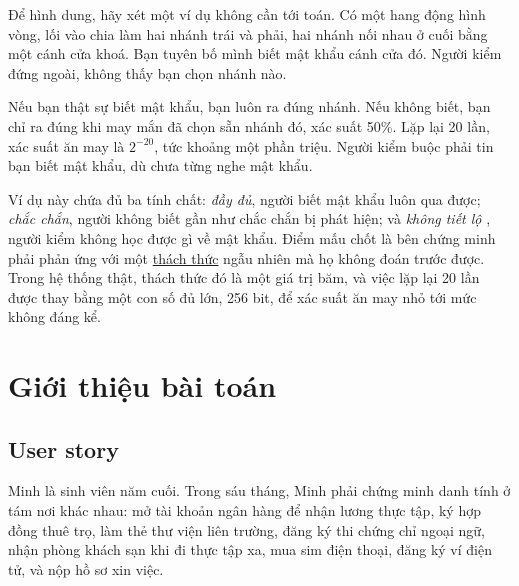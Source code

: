 \documentclass[a4paper,11pt,oneside]{report}
\theoremstyle{definition}
\theoremstyle{plain}
\newcommand{\g}[2]{\hyperref[term:#1]{#2}}
\begin{document}
Để hình dung, hãy xét một ví dụ không cần tới toán. Có một hang động hình vòng, lối vào chia làm
hai nhánh trái và phải, hai nhánh nối nhau ở cuối bằng một cánh cửa khoá. Bạn tuyên bố mình biết
mật khẩu cánh cửa đó. Người kiểm đứng ngoài, không thấy bạn chọn nhánh nào.

\begin{center}
\end{center}

Nếu bạn thật sự biết mật khẩu, bạn luôn ra đúng nhánh. Nếu không biết, bạn chỉ ra đúng khi may
mắn đã chọn sẵn nhánh đó, xác suất 50\%. Lặp lại 20 lần, xác suất ăn may là $2^{-20}$, tức khoảng
một phần triệu. Người kiểm buộc phải tin bạn biết mật khẩu, dù chưa từng nghe mật khẩu.

Ví dụ này chứa đủ ba tính chất: \emph{đầy đủ}, người biết mật khẩu luôn qua được;
\emph{chắc chắn}, người không biết gần như chắc chắn bị phát hiện; và \emph{không tiết lộ} , 
người kiểm không học được gì về mật khẩu. Điểm mấu chốt là bên chứng minh phải phản ứng với một
\g{challenge}{thách thức} ngẫu nhiên mà họ không đoán trước được. Trong hệ thống thật, thách thức
đó là một giá trị băm, và việc lặp lại 20 lần được thay bằng một con số đủ lớn, 256 bit, để xác
suất ăn may nhỏ tới mức không đáng kể.

\chapter{Giới thiệu bài toán}

\section{User story}

Minh là sinh viên năm cuối. Trong sáu tháng, Minh phải chứng minh danh tính ở tám nơi khác nhau:
mở tài khoản ngân hàng để nhận lương thực tập, ký hợp đồng thuê trọ, làm thẻ thư viện liên
trường, đăng ký thi chứng chỉ ngoại ngữ, nhận phòng khách sạn khi đi thực tập xa, mua sim điện
thoại, đăng ký ví điện tử, và nộp hồ sơ xin việc.
\end{document}
